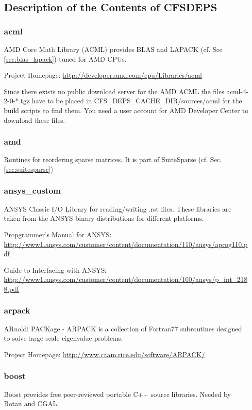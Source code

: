 \subsection{Description of the Contents of CFSDEPS}

\subsubsection{acml}  AMD Core Math  Library (ACML)  provides BLAS  and LAPACK
(cf. Sec \ref{sec:blas_lapack}) tuned for AMD CPUs.

\noindent Project Homepage: \url{http://developer.amd.com/cpu/Libraries/acml}

Since  there exists  no public  download  server for  the AMD  ACML the  files
acml-4-2-0-*.tgz have to be  placed in CFS\_DEPS\_CACHE\_DIR/sources/acml for the
build scripts to  find them. You need a user account  for AMD Developer Center
to download these files.

\subsubsection{amd}  Routines for reordering  sparse matrices.  It is  part of
SuiteSparse (cf. Sec. \ref{sec:suitesparse})

\subsubsection{ansys\_custom}  ANSYS Classic  I/O Library  for reading/writing
.rst files.  These libraries are taken from the ANSYS binary distributions for
different platforms.

\noindent          Propgrammer's           Manual          for          ANSYS:
\url{http://www1.ansys.com/customer/content/documentation/110/ansys/aprog110.pdf}

\noindent          Guide to Interfacing with ANSYS:
\url{http://www1.ansys.com/customer/content/documentation/100/ansys/p_int_2188.pdf}

\subsubsection{arpack} ARnoldi  PACKage - ARPACK is a  collection of Fortran77
subroutines designed to solve large scale eigenvalue problems.

\noindent Project Homepage: \url{http://www.caam.rice.edu/software/ARPACK/}

\subsubsection{boost}  Boost provides free  peer-reviewed portable  C++ source
libraries. Needed by Botan and CGAL.

